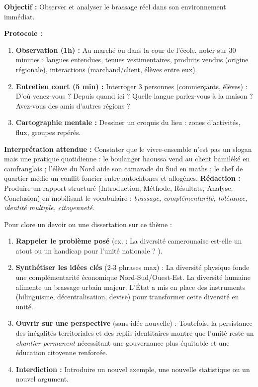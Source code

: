 \documentclass[11pt]{article}
\newcommand{\cle}[1]{{\popxbold\color{popdark}#1}}
\begin{document}
\begin{experience}
\textbf{Objectif :} Observer et analyser le brassage réel dans son environnement immédiat.
\par
\textbf{Protocole :}
\begin{enumerate}
    \item \textbf{Observation (1h) :} Au marché ou dans la cour de l'école, noter sur 30 minutes : langues entendues, tenues vestimentaires, produits vendus (origine régionale), interactions (marchand/client, élèves entre eux).
    \item \textbf{Entretien court (5 min) :} Interroger 3 personnes (commerçants, élèves) : \og D'où venez-vous ? Depuis quand ici ? Quelle langue parlez-vous à la maison ? Avez-vous des amis d'autres régions ? \fg
    \item \textbf{Cartographie mentale :} Dessiner un croquis du lieu : zones d'activités, flux, groupes repérés.
\end{enumerate}
\textbf{Interprétation attendue :} Constater que le \cle{vivre-ensemble} n'est pas un slogan mais une pratique quotidienne : le boulanger haoussa vend au client bamiléké en camfranglais ; l'élève du Nord aide son camarade du Sud en maths ; le chef de quartier médie un conflit foncier entre autochtones et allogènes.
\textbf{Rédaction :} Produire un rapport structuré (Introduction, Méthode, Résultats, Analyse, Conclusion) en mobilisant le vocabulaire : \emph{brassage, complémentarité, tolérance, identité multiple, citoyenneté}.
\end{experience}

\begin{methode}
Pour clore un devoir ou une dissertation sur ce thème :
\begin{enumerate}
    \item \textbf{Rappeler le problème posé} (ex. : \og La diversité camerounaise est-elle un atout ou un handicap pour l'unité nationale ? \fg).
    \item \textbf{Synthétiser les idées clés} (2-3 phrases max) : \og La diversité physique fonde une complémentarité économique Nord-Sud/Ouest-Est. La diversité humaine alimente un brassage urbain majeur. L'État a mis en place des instruments (bilinguisme, décentralisation, devise) pour transformer cette diversité en unité. \fg
    \item \textbf{Ouvrir sur une perspective} (sans idée nouvelle) : \og Toutefois, la persistance des inégalités territoriales et des replis identitaires montre que l'unité reste un \emph{chantier permanent} nécessitant une gouvernance plus équitable et une éducation citoyenne renforcée. \fg
    \item \textbf{Interdiction :} Introduire un nouvel exemple, une nouvelle statistique ou un nouvel argument.
\end{enumerate}
\end{methode}
\end{document}
